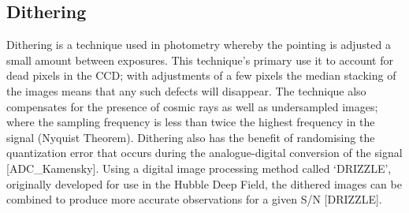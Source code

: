 
\subsection{Dithering} %
\label{sub:dithering}
	Dithering is a technique used in photometry whereby the pointing is adjusted a small amount between exposures. This technique’s primary use it to account for dead pixels in the CCD; with adjustments of a few pixels the median stacking of the images means that any such defects will disappear. The technique also compensates for the presence of cosmic rays as well as undersampled images; where the sampling frequency is less than twice the highest frequency in the signal (Nyquist Theorem). Dithering also has the benefit of randomising the quantization error that occurs during the analogue-digital conversion of the signal [ADC_Kamensky]. Using a digital image processing method called ‘DRIZZLE’, originally developed for use in the Hubble Deep Field, the dithered images can be combined to produce more accurate observations for a given S/N [DRIZZLE].
